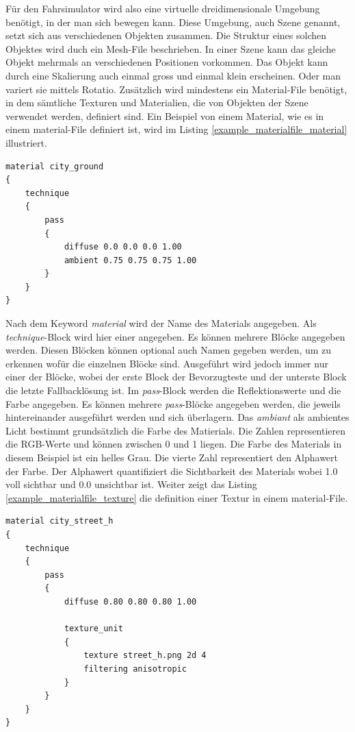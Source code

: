 Für den Fahrsimulator wird also eine virtuelle dreidimensionale Umgebung benötigt, in der man sich bewegen kann. Diese Umgebung, auch Szene genannt, setzt sich aus verschiedenen Objekten zusammen. Die Struktur eines solchen Objektes wird duch ein Mesh-File beschrieben. In einer Szene kann das gleiche Objekt mehrmals an verschiedenen Positionen vorkommen. Das Objekt kann durch eine Skalierung auch einmal gross und einmal klein erscheinen. Oder man variert sie mittels Rotatio. Zusätzlich wird mindestens ein Material-File benötigt, in dem sämtliche Texturen und Materialien, die von Objekten der Szene verwendet werden, definiert sind.
Ein Beispiel von einem Material, wie es in einem material-File definiert ist, wird im Listing \ref{example_materialfile_material} illustriert.
\begin{lstlisting}[caption={Beispiel aus dem material-File für ein Material},label={example_materialfile_material}]
material city_ground
{
	technique
	{
		pass
		{
			diffuse 0.0 0.0 0.0 1.00
			ambient 0.75 0.75 0.75 1.00	
		}
	}
}
\end{lstlisting}
Nach dem Keyword \textit{material} wird der Name des Materials angegeben. Als \textit{technique}-Block wird hier einer angegeben. Es können mehrere Blöcke angegeben werden. Diesen Blöcken können optional auch Namen gegeben werden, um zu erkennen wofür die einzelnen Blöcke sind. Ausgeführt wird jedoch immer nur einer der Blöcke, wobei der erste Block der Bevorzugteste und der unterste Block die letzte Fallbacklösung ist. Im \textit{pass}-Block werden die Reflektionswerte und die Farbe angegeben. Es können mehrere \textit{pass}-Blöcke angegeben werden, die jeweils hintereinander ausgeführt werden und sich überlagern. Das \textit{ambiant} als ambientes Licht bestimmt grundsätzlich die Farbe des Matierials. Die Zahlen representieren die RGB-Werte und können zwischen 0 und 1 liegen. Die Farbe des Materials in diesem Beispiel ist ein helles Grau. Die vierte Zahl representiert den Alphawert der Farbe. Der Alphawert quantifiziert die Sichtbarkeit des Materials wobei 1.0 voll sichtbar und 0.0 unsichtbar ist.
Weiter zeigt das Listing \ref{example_materialfile_texture} die definition einer Textur in einem material-File.\\
\begin{lstlisting}[caption={Beispiel aus dem material-File zur Beschreibung einer Textur},label={example_materialfile_texture}]
material city_street_h
{
	technique
	{
		pass
		{
			diffuse 0.80 0.80 0.80 1.00

			texture_unit
			{
				texture street_h.png 2d 4
				filtering anisotropic
			}
		}
	}
}
\end{lstlisting}
